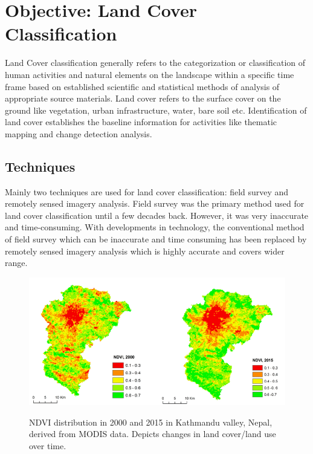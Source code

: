 \documentclass[12pt, a4paper]{report}
\begin{document}
\section{Objective: Land Cover Classification}
Land Cover classification generally refers to the categorization or classification of human activities and natural elements on the landscape within a specific time frame based on established scientific and statistical methods of analysis of appropriate source materials. Land cover refers to the surface cover on the ground like vegetation, urban infrastructure, water, bare soil etc. Identification of land cover establishes the baseline information for activities like thematic mapping and change detection analysis.\cite{landcoversig}
\subsection{Techniques}
Mainly two techniques are used for land cover classification: field survey and remotely sensed imagery analysis. Field survey was the primary method used for land cover classification until a few decades back. However, it was very inaccurate and time-consuming. With developments in technology, the conventional method of field survey which can be inaccurate and time consuming has been replaced by remotely sensed imagery analysis which is highly accurate and covers wider range.

\begin{figure}[h]
\centering
\includegraphics[width=\textwidth]{landcover.png}
\caption{NDVI distribution in 2000 and 2015 in Kathmandu valley, Nepal, derived from MODIS data. Depicts changes in land cover/land use over time.}
\cite{lcimg}
\end{figure}
\end{document}
